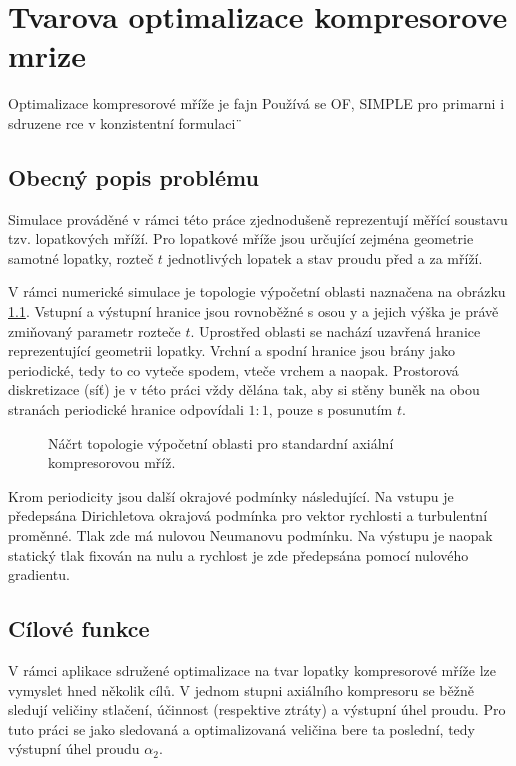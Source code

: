 

\chapter{Tvarova optimalizace kompresorove mrize}

Optimalizace kompresorové mříže je fajn
Používá se OF, SIMPLE pro primarni i sdruzene rce v konzistentní formulaci¨


\section{Obecný popis problému}

Simulace prováděné v rámci této práce zjednodušeně reprezentují měřící soustavu tzv. lopatkových mříží. Pro lopatkové mříže jsou určující zejména geometrie samotné lopatky, rozteč $ t $ jednotlivých lopatek a stav proudu před a za mříží.

V rámci numerické simulace je topologie výpočetní oblasti naznačena na obrázku \ref{fig:vypocetni_oblast}. Vstupní a výstupní hranice jsou rovnoběžné s osou y a jejich výška je právě zmiňovaný parametr rozteče $ t $. Uprostřed oblasti se nachází uzavřená hranice reprezentující geometrii lopatky. Vrchní a spodní hranice jsou brány jako periodické, tedy to co vyteče spodem, vteče vrchem a naopak. Prostorová diskretizace (síť) je v této práci vždy dělána tak, aby si stěny buněk na obou stranách periodické hranice odpovídali $ 1:1 $, pouze s posunutím $ t $.

\begin{figure}
	\def\svgwidth{0.8\textwidth}
	\graphicspath{{img/inkscape/}}
	
	\caption{Náčrt topologie výpočetní oblasti pro standardní axiální kompresorovou mříž.}
	\label{fig:vypocetni_oblast}
\end{figure}

Krom periodicity jsou další okrajové podmínky následující. Na vstupu je předepsána Dirichletova okrajová podmínka pro vektor rychlosti a turbulentní proměnné. Tlak zde má nulovou Neumanovu podmínku. Na výstupu je naopak statický tlak fixován na nulu a rychlost je zde předepsána pomocí nulového gradientu.

\section{Cílové funkce}

V rámci aplikace sdružené optimalizace na tvar lopatky kompresorové mříže lze vymyslet hned několik cílů. V jednom stupni axiálního kompresoru se běžně sledují veličiny stlačení, účinnost (respektive ztráty) a výstupní úhel proudu. Pro tuto práci se jako sledovaná a optimalizovaná veličina bere ta poslední, tedy výstupní úhel proudu $ \alpha_2 $. 

